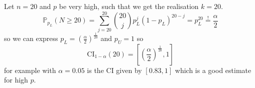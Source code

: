 \begin{example}
	Let $n = 20$ and $p$ be very high, such that we get the realisation $k = 20$. 
	\[
		\mathbb{P}_{p_L} \left( N \geq 20 \right) 
		=
		\sum_{j = 20}^{20} \binom{20}{j} p_L^j (1- p_L)^{20-j} 
		=
		p_L^{20} 
		\overset{!}{=}
		\frac{\alpha}{2}
	\]
	so we can express $p_L = \left( \frac{\alpha}{2} \right)^{\frac{1}{20}}$ and $p_U = 1$ so 
	\[
		\text{CI}_{1- \alpha} (20) = \left[ \left( \frac{\alpha}{2} \right)^{\frac{1}{20}}, 1 \right]
	\]
	for example with $\alpha = 0.05$ is the CI given by $[0.83, 1]$ which is a good estimate for high $p$.
	
\end{example}

